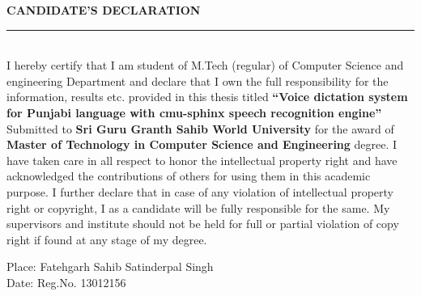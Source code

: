 \documentclass[12pt,a4paper,oldfontcommands]{memoir}
\newenvironment{candidate}%
    {\large\bfseries\centering CANDIDATE'S DECLARATION%
    \par\medskip\normalfont\normalsize}%
    {}%
\begin{document}
\newpage
\begin{candidate}
\noindent\rule{17cm}{1.0 pt} \\

\justify
I hereby certify that I am student of M.Tech (regular) of Computer Science and engineering Department and declare that I own the full responsibility for the information, results etc. provided in this thesis titled \textbf{“Voice dictation system for Punjabi language with cmu-sphinx speech recognition engine”} Submitted to \textbf{Sri Guru Granth Sahib World University} for the award of \textbf{Master of Technology in Computer Science and Engineering} degree. I have taken care in all respect to honor the intellectual property right and have acknowledged the contributions of others for using them in this academic purpose. I further declare that in case of any violation of intellectual property right or copyright, I as a candidate will be fully responsible for the same. My supervisors and institute should not be held for full or partial violation of copy right if found at any stage of my degree.
\vspace{3 cm}

\noindent Place:  Fatehgarh Sahib   \hfill Satinderpal Singh \\
\noindent Date: \hfill Reg.No. 13012156
\end{candidate}
\newpage
\end{document}
